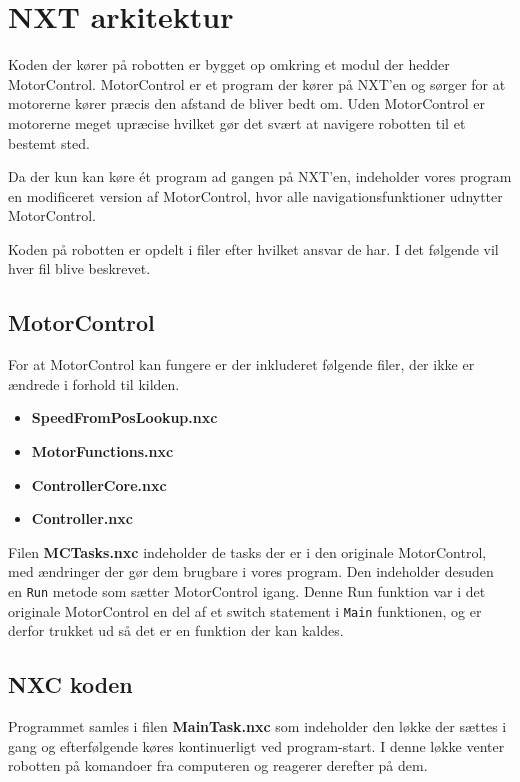 \section{NXT arkitektur}
Koden der kører på robotten er bygget op omkring et modul der hedder MotorControl. \cite{MotorControl}
MotorControl er et program der kører på NXT'en og sørger for at motorerne kører præcis den afstand de bliver bedt om. 
Uden MotorControl er motorerne meget upræcise hvilket gør det svært at navigere robotten til et bestemt sted.

Da der kun kan køre ét program ad gangen på NXT'en, indeholder vores program en modificeret version af MotorControl, hvor alle navigationsfunktioner udnytter MotorControl.

Koden på robotten er opdelt i filer efter hvilket ansvar de har.
I det følgende vil hver fil blive beskrevet.

\subsection{MotorControl}
For at MotorControl kan fungere er der inkluderet følgende filer, der ikke er ændrede i forhold til kilden.

\begin{itemize}
\item \textbf{SpeedFromPosLookup.nxc}
\item \textbf{MotorFunctions.nxc}
\item \textbf{ControllerCore.nxc}
\item \textbf{Controller.nxc}
\end{itemize}

Filen \textbf{MCTasks.nxc} indeholder de tasks der er i den originale MotorControl, med ændringer der gør dem brugbare i vores program.
Den indeholder desuden en \lstinline[style=c]!Run! metode som sætter MotorControl igang. 
Denne Run funktion var i det originale MotorControl en del af et switch statement i \lstinline[style=c]!Main! funktionen, og er derfor trukket ud så det er en funktion der kan kaldes.

\subsection{NXC koden}

Programmet samles i filen \textbf{MainTask.nxc} som indeholder den løkke der sættes i gang og efterfølgende køres kontinuerligt ved program-start. 
I denne løkke venter robotten på komandoer fra computeren og reagerer derefter på dem.

